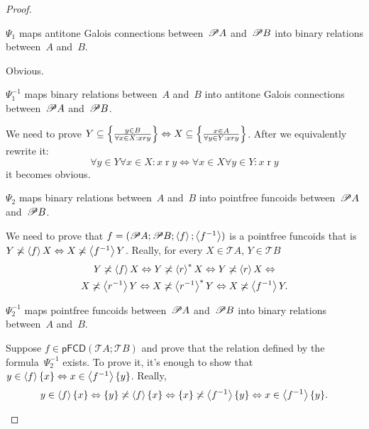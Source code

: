 \begin{proof}
\begin{claim}
$\Psi_1$ maps antitone Galois connections between~$\mathscr{P} A$ and~$\mathscr{P} B$ into binary relations between~$A$ and~$B$.
\end{claim}
\begin{claimproof}
Obvious.
\end{claimproof}

\begin{claim}
$\Psi_1^{-1}$ maps binary relations between~$A$ and~$B$ into antitone Galois connections between~$\mathscr{P} A$ and~$\mathscr{P} B$.
\end{claim}
\begin{claimproof}
We need to prove $Y\subseteq\left\{ \frac{y\in B}{\forall x\in X:x\mathrel{r}y}\right\}\Leftrightarrow X\subseteq\left\{ \frac{x\in A}{\forall y\in Y:x\mathrel{r}y}\right\}$.
After we equivalently rewrite it:
\[\forall y\in Y \forall x\in X:x\mathrel{r}y\Leftrightarrow\forall x\in X\forall y\in Y:x\mathrel{r}y\]
it becomes obvious.
\end{claimproof}

\begin{claim}
$\Psi_2$ maps binary relations between~$A$ and~$B$ into pointfree funcoids between~$\mathscr{P} A$ and~$\mathscr{P} B$.
\end{claim}
\begin{claimproof}
We need to prove that $f=(\mathscr{P} A;\mathscr{P} B;\left\langle f\right\rangle;\left\langle f^{-1}\right\rangle)$ is a pointfree funcoids that is $Y\not\asymp\left\langle f\right\rangle X\Leftrightarrow X\not\asymp\left\langle f^{-1}\right\rangle Y$. Really, for every
$X\in\mathscr{T}A$, $Y\in\mathscr{T}B$ 
\begin{multline*}
Y\not\asymp\left\langle f\right\rangle X\Leftrightarrow Y\not\asymp\left\langle r\right\rangle ^{\ast}X\Leftrightarrow Y\not\asymp\left\langle r\right\rangle X\Leftrightarrow\\
X\not\asymp\left\langle r^{-1}\right\rangle Y\Leftrightarrow X\not\asymp\left\langle r^{-1}\right\rangle ^{\ast}Y\Leftrightarrow X\not\asymp\left\langle f^{-1}\right\rangle Y.
\end{multline*}
\end{claimproof}

\begin{claim}
$\Psi_2^{-1}$ maps pointfree funcoids between~$\mathscr{P} A$ and~$\mathscr{P} B$ into binary relations between~$A$ and~$B$.
\end{claim}
\begin{claimproof}
Suppose $f\in\mathsf{pFCD}(\mathscr{T}A;\mathscr{T}B)$ and prove
that the relation defined by the formula~$\Psi_2^{-1}$ exists.
To prove it, it's enough to show that $y\in\left\langle f\right\rangle\{x\}\Leftrightarrow x\in\left\langle f^{-1}\right\rangle\{y\}$.
Really, 
\[
y\in\left\langle f\right\rangle\{x\}\Leftrightarrow\{y\}\not\asymp\left\langle f\right\rangle\{x\}\Leftrightarrow\{x\}\not\asymp\left\langle f^{-1}\right\rangle\{y\}\Leftrightarrow x\in\left\langle f^{-1}\right\rangle\{y\}.
\]
\end{claimproof}


\end{proof}
